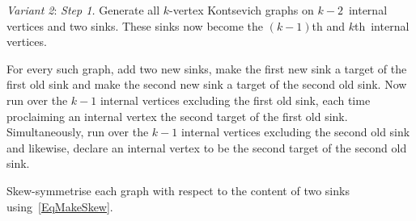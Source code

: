 \documentclass[a4paper]{jpconf}%
\theoremstyle{definition}
\newtheorem{example}{Example}%
\theoremstyle{remark}
\begin{document}
\smallskip\noindent%
{\textit{Variant 2}: \textit{Step 1.}} Generate all $k$-vertex Kontsevich graphs on
$k-2$~internal vertices  and two sinks.
These sinks now become
the $(k-1)$th and $k$th~internal vertices.

{} For every such graph, add two new sinks, make the first new sink a target of the first old sink and make the second 
new sink a target of the second old sink. Now run over the $k-1$ internal 
vertices excluding the first old sink, each time proclaiming an internal vertex 
the second target of the first old sink. 
Simultaneously, run over the $k-1$ internal vertices excluding the second old
sink and likewise, declare an internal vertex to be the second target of the second 
old sink.

{} %
Skew\/-\/symmetrise each graph with respect to the content of two sinks using~\eqref{EqMakeSkew}.

\end{document}
